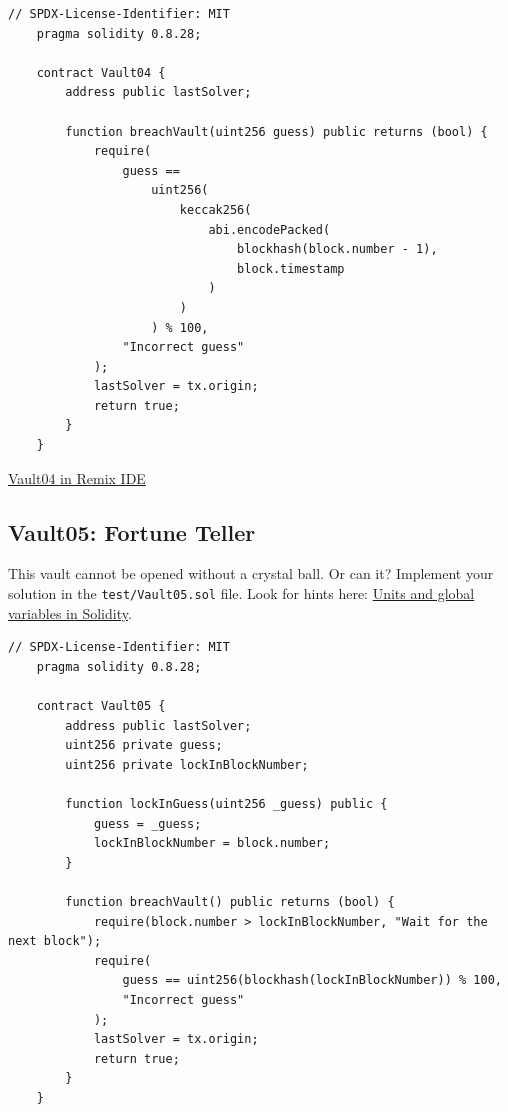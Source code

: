 \documentclass[12pt]{article}
\begin{document}
\noindent
\begin{minipage}{\textwidth}
    \begin{lstlisting}[language=Solidity]
    // SPDX-License-Identifier: MIT
    pragma solidity 0.8.28;
    
    contract Vault04 {
        address public lastSolver;
    
        function breachVault(uint256 guess) public returns (bool) {
            require(
                guess ==
                    uint256(
                        keccak256(
                            abi.encodePacked(
                                blockhash(block.number - 1),
                                block.timestamp
                            )
                        )
                    ) % 100,
                "Incorrect guess"
            );
            lastSolver = tx.origin;
            return true;
        }
    }
\end{lstlisting}
\end{minipage}

\medskip
\noindent
\href{https://remix.ethereum.org/?#activate=solidity&url=https://github.com/radovluk/unbreakable-vault/contracts/Vault04.sol&lang=en&optimize=false&runs=200&evmVersion=null&version=soljson-v0.8.28+commit.7893614a.js}{Vault04 in Remix IDE}

\subsection*{Vault05: Fortune Teller}

This vault cannot be opened without a crystal ball. Or can it? Implement your
solution in the \texttt{test/Vault05.sol} file. Look for hints here:
\href{https://docs.soliditylang.org/en/latest/units-and-global-variables.html}{Units
    and global variables in Solidity}.

\noindent
\begin{minipage}{\textwidth}
    \begin{lstlisting}[language=Solidity]
    // SPDX-License-Identifier: MIT
    pragma solidity 0.8.28;
    
    contract Vault05 {
        address public lastSolver;
        uint256 private guess;
        uint256 private lockInBlockNumber;
    
        function lockInGuess(uint256 _guess) public {
            guess = _guess;
            lockInBlockNumber = block.number;
        }
    
        function breachVault() public returns (bool) {
            require(block.number > lockInBlockNumber, "Wait for the next block");
            require(
                guess == uint256(blockhash(lockInBlockNumber)) % 100,
                "Incorrect guess"
            );
            lastSolver = tx.origin;
            return true;
        }
    }
    
\end{lstlisting}
\end{minipage}
\end{document}
